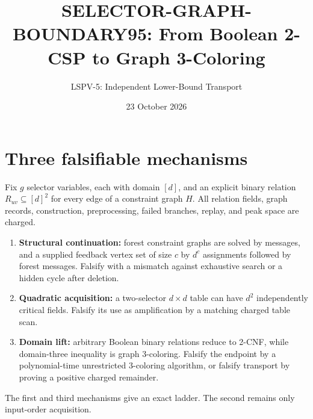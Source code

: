 \documentclass[11pt]{article}
\title{SELECTOR-GRAPH-BOUNDARY95: From Boolean 2-CSP to Graph 3-Coloring}
\author{LSPV-5: Independent Lower-Bound Transport}
\date{23 October 2026}
\begin{document}
\maketitle
\begin{center}
\end{center}

\section{Three falsifiable mechanisms}
Fix $g$ selector variables, each with domain $[d]$, and an explicit binary
relation $R_{uv}\subseteq[d]^2$ for every edge of a constraint graph $H$.
All relation fields, graph records, construction, preprocessing, failed
branches, replay, and peak space are charged.

\begin{enumerate}
\item \textbf{Structural continuation:} forest constraint graphs are solved
by messages, and a supplied feedback vertex set of size $c$ by $d^c$
assignments followed by forest messages. Falsify with a mismatch against
exhaustive search or a hidden cycle after deletion.
\item \textbf{Quadratic acquisition:} a two-selector $d\times d$ table can
have $d^2$ independently critical fields. Falsify its use as amplification by
a matching charged table scan.
\item \textbf{Domain lift:} arbitrary Boolean binary relations reduce to
2-CNF, while domain-three inequality is graph 3-coloring. Falsify the endpoint
by a polynomial-time unrestricted 3-coloring algorithm, or falsify transport
by proving a positive charged remainder.
\end{enumerate}
The first and third mechanisms give an exact ladder. The second remains only
input-order acquisition.
\end{document}
